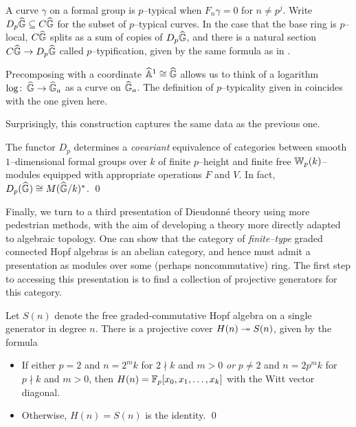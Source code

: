 \begin{definition}
A curve $\gamma$ on a formal group is $p$--typical when $F_n \gamma = 0$ for $n \ne p^j$.  Write $D_p\widehat{\mathbb G} \subseteq C\widehat{\mathbb G}$ for the subset of $p$--typical curves.  In the case that the base ring is $p$--local, $C\widehat{\mathbb G}$ splits as a sum of copies of $D_p \widehat{\mathbb G}$, and there is a natural section $C\widehat{\mathbb G} \to D_p \widehat{\mathbb G}$ called $p$--typification, given by the same formula as in .
\end{definition}

\begin{remark}
Precomposing with a coordinate $\widehat{\mathbb{A}}^1 \cong \widehat{\mathbb G}$ allows us to think of a logarithm $\log\colon\thinspace \widehat{\mathbb G} \to \widehat{\mathbb G}_a$ as a curve on $\widehat{\mathbb G}_a$.  The definition of $p$--typicality given in  coincides with the one given here.
\end{remark}

Surprisingly, this construction captures the same data as the previous one.

\begin{theorem}
The functor $D_p$ determines a \emph{covariant} equivalence of categories between smooth $1$--dimensional formal groups over $k$ of finite $p$--height and finite free $\mathbb W_p(k)$--modules equipped with appropriate operations $F$ and $V$.  In fact, $D_p(\widehat{\mathbb G}) \cong M(\widehat{\mathbb G}/k)^*$. \qed {}
\end{theorem}

Finally, we turn to a third presentation of Dieudonn\'e theory using more pedestrian methods, with the aim of developing a theory more directly adapted to algebraic topology.  One can show that the category of \emph{finite--type} graded connected Hopf algebras is an abelian category, and hence must admit a presentation as modules over some (perhaps noncommutative) ring.  The first step to accessing this presentation is to find a collection of projective generators for this category.

\begin{theorem}
Let $S(n)$ denote the free graded-commutative Hopf algebra on a single generator in degree $n$.  There is a projective cover $H(n) \twoheadrightarrow S(n)$, given by the formula
\begin{itemize}
\item If either $p = 2$ and $n = 2^m k$ for $2 \nmid k$ and $m > 0$ \emph{or} $p \ne 2$ and $n = 2p^m k$ for $p \nmid k$ and $m > 0$, then $H(n) = \mathbb F_p[x_0, x_1, \ldots, x_k]$ with the Witt vector diagonal.
\item Otherwise, $H(n) = S(n)$ is the identity.
\qed
\end{itemize}
\end{theorem}


